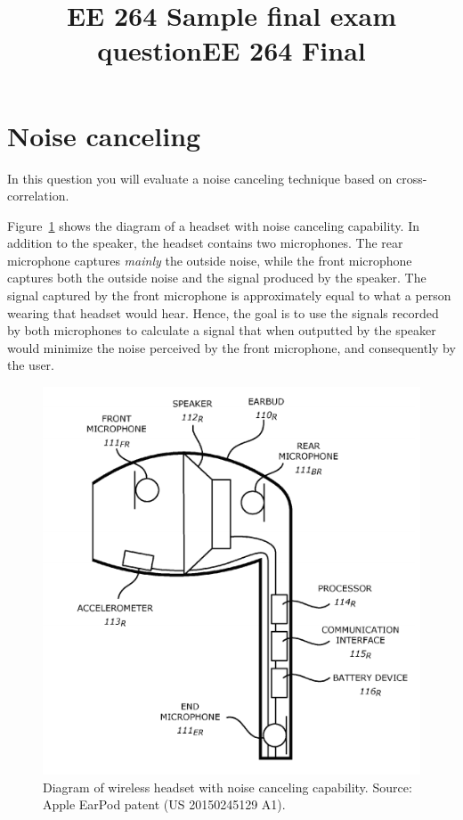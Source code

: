 \documentclass[10pt]{article}
\title{EE 264 Sample final exam question}
\title{EE 264 Final}
\begin{document}
% 
\pagebreak


\section*{Noise canceling}

In this question you will evaluate a noise canceling technique based on cross-correlation.

Figure~\ref{fig:earpod} shows the diagram of a headset with noise canceling capability. In addition to the speaker, the headset contains two microphones. The rear microphone captures \textit{mainly} the outside noise, while the front microphone captures both the outside noise and the signal produced by the speaker. The signal captured by the front microphone is approximately equal to what a person wearing that headset would hear. Hence, the goal is to use the signals recorded by both microphones to calculate a signal that when outputted by the speaker would minimize the noise perceived by the front microphone, and consequently by the user.

\FloatBarrier
\begin{figure}[h!]
	\centering
	\includegraphics[scale=0.7]{figs/apple_headphone.png}
	\caption{Diagram of wireless headset with noise canceling capability. Source: Apple EarPod patent (US 20150245129 A1).}
	\label{fig:earpod}
\end{figure}
\FloatBarrier
\end{document}
